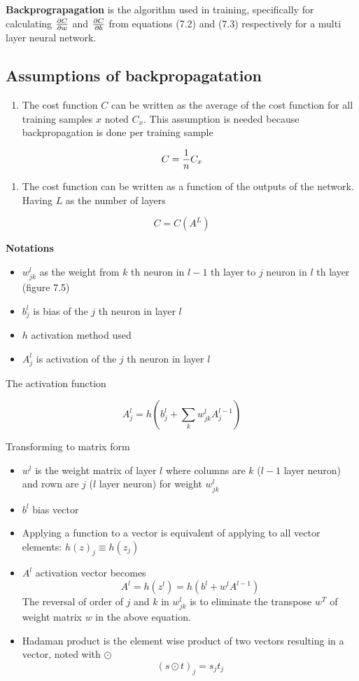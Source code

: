 \textbf{Backprograpagation} is the algorithm used in training, specifically for calculating \(\partial C \over \partial w\)  and \(\partial C \over \partial b\) from equations (7.2) and (7.3) respectively for a multi layer neural network.

\subsection{Assumptions of backpropagatation}

\begin{enumerate}
    \item The cost function \(C\) can be written as the average of the cost function for all training samples \(x\) noted \(C_x\). This assumption is needed because backpropagation is done per training sample
\end{enumerate}

\[C = {1 \over n} C_x\]

\begin{enumerate}
    \item The cost function can be written as a function of the outputs of the network. Having \(L\) as the number of layers
\end{enumerate}

\[C = C(A^L)\]

\textbf{Notations}

\begin{itemize}
    \item \(w_{jk}^l\) as the weight from \(k\) th neuron in \(l-1\) th layer to \(j\) neuron in \(l\) th layer (figure 7.5)
    \item \(b_j^l\) is bias of the \(j\) th neuron in layer \(l\)
    \item \(h\) activation method used
    \item \(A_j^l\) is activation of the \(j\) th neuron in layer \(l\)
\end{itemize}

   The activation function

   \[A_j^l = h(b_j^l + \sum_k w_{jk}^l A_j^{l-1})\]

Transforming to matrix form

\begin{itemize}
    \item \(w^l\) is the weight matrix of layer \(l\) where columns are  \(k\) (\(l-1\) layer neuron) and rown are \(j\) (\(l\) layer neuron) for weight \(w_{jk}^l\)
    \item \(b^l\) bias vector
    \item Applying a function to a vector is equivalent of applying to all vector elements: \(h(z)_j \equiv h(z_j)\)
    \item \(A^l\) activation vector becomes\[A^l = h(z^l) = h(b^l + w^l A^{l-1})\] The reversal of order of \(j\) and \(k\) in \(w_{jk}^l\) is to eliminate the transpose \(w^T\) of weight matrix \(w\) in the above equation.
    \item Hadaman product is the element wise product of two vectors resulting in a vector, noted with \(\odot\) \[(s \odot t)_j = s_j t_j\]
\end{itemize}



